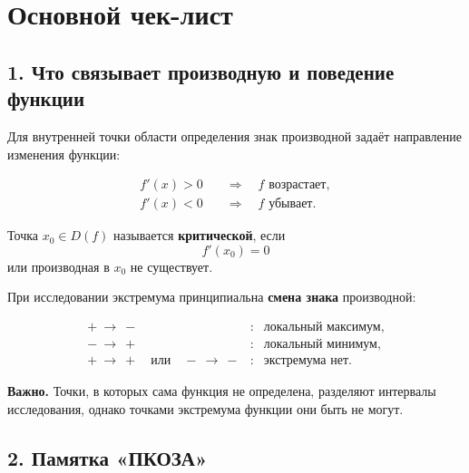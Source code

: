 \documentclass[a4paper,12pt]{article}
\begin{document}

\section*{Основной чек-лист}

\subsection*{1. Что связывает производную и поведение функции}

Для внутренней точки области определения знак производной задаёт направление изменения функции:

\[
\begin{aligned}
f'(x)>0
&\quad\Longrightarrow\quad
f \text{ возрастает},
\\
f'(x)<0
&\quad\Longrightarrow\quad
f \text{ убывает}.
\end{aligned}
\]

Точка \(x_0\in D(f)\) называется \textbf{критической}, если
\[
f'(x_0)=0
\]
или производная в \(x_0\) не существует.

При исследовании экстремума принципиальна \textbf{смена знака} производной:

\[
\begin{array}{ccl}
+\ \longrightarrow\ -
&:&
\text{локальный максимум},
\\[1mm]
-\ \longrightarrow\ +
&:&
\text{локальный минимум},
\\[1mm]
+\ \longrightarrow\ +
\quad\text{или}\quad
-\ \longrightarrow\ -
&:&
\text{экстремума нет}.
\end{array}
\]

\textbf{Важно.}
Точки, в которых сама функция не определена, разделяют интервалы исследования, однако точками экстремума функции они быть не могут.

\subsection*{2. Памятка «ПКОЗА»}
\end{document}
